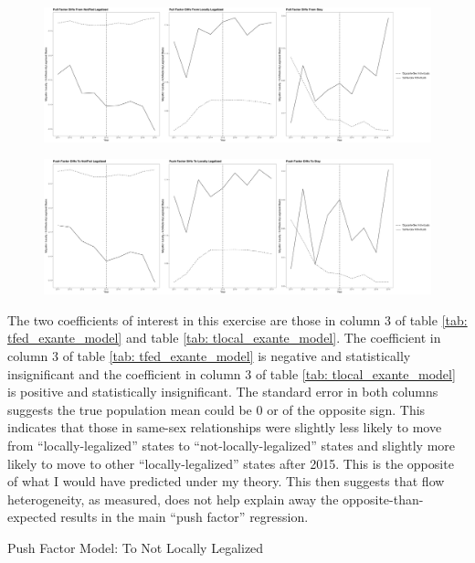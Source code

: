 \documentclass[12pt,letterpaper]{article}
\begin{document}
\begin{figure}[h]
    \centering
    \includegraphics[width=1\linewidth]{outputs/summary_stats/flows_post_diffs.png}
    \caption{}
    \label{fig: flows_post_diffs}
\end{figure}
\begin{figure}[h]
    \centering
    \includegraphics[width=1\linewidth]{outputs/summary_stats/flows_ante_diffs.png}
    \caption{}
    \label{fig: flows_ante_diffs}
\end{figure}

 The two coefficients of interest in this exercise are those in column 3  of table \ref{tab: tfed_exante_model} and table \ref{tab: tlocal_exante_model}. The coefficient in column 3 of table \ref{tab: tfed_exante_model} is negative and statistically insignificant and the coefficient in column 3 of table \ref{tab: tlocal_exante_model} is positive and statistically insignificant. The standard error in both columns suggests the true population mean could be 0 or of the opposite sign. This indicates that those in same-sex relationships were slightly less likely to move from “locally-legalized” states to “not-locally-legalized” states and slightly more likely to move to other “locally-legalized” states after 2015. This is the opposite of what I would have predicted under my theory. This then suggests that flow heterogeneity, as measured, does not help explain away the opposite-than-expected results in the main “push factor” regression. 

\begin{table}[p] %
    \centering
    \caption{Push Factor Model: To Not Locally Legalized}
    \label{tab: tfed_exante_model}
    
\end{table}
\end{document}
